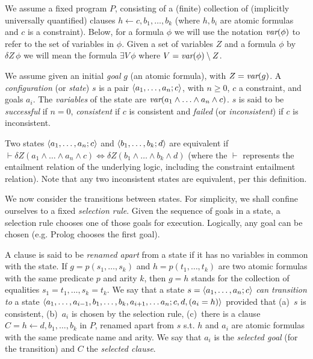 \documentclass{article} %
\begin{document}
We assume a fixed program $P$, consisting of a (finite) collection of (implicitly universally quantified) clauses $h \leftarrow c, b_1, \ldots, b_k$ (where $h, b_i$ are atomic formulas and $c$ is a constraint).  Below, for a formula $\phi$ we will use the notation $\mbox{\em var}(\phi)$ to refer to the set of variables in $\phi$. Given a set of variables $Z$ and a formula $\phi$ by $\delta Z\, \phi$ we will mean the formula $\exists V\,\phi$ where $V=\mbox{\em var}(\phi)\setminus Z$. 

We assume given an initial {\em goal} $g$ (an atomic formula), with $Z=\mbox{\em var}(g)$. A {\em configuration} (or {\em state}) $s$ is a pair $\langle a_1, \ldots, a_n; c\rangle$, with $n\geq 0$, $c$ a constraint, and goals $a_i$. The {\em variables} of the state are $\mbox{\em var}(a_1\wedge\ldots\wedge a_n\wedge c)$. $s$ is said to be {\em successful} if $n=0$, {\em consistent} if $c$ is consistent and {\em failed} (or {\em inconsistent}) if $c$ is inconsistent. 

Two states $\langle a_1, \ldots, a_n; c\rangle$ and $\langle b_1, \ldots, b_k; d\rangle$ are equivalent if $\vdash \delta Z (a_1 \wedge \ldots \wedge a_n \wedge c) \Leftrightarrow \delta Z (b_1 \wedge \ldots \wedge b_k \wedge d)$ (where the $\vdash$ represents the entailment relation of the underlying logic, including the constraint entailment relation). Note that any two inconsistent states are equivalent, per this definition. 

We now consider the transitions between states. For simplicity, we shall confine ourselves to a fixed {\em selection rule}. Given the sequence of goals in a state, a selection rule chooses one of those goals for execution. Logically, any goal can be chosen (e.g.{} Prolog chooses the first goal).

A clause is said to be {\em renamed apart} from a state if it has no variables in common with the state.  If $g=p(s_1,\ldots,s_k)$ and $h=p(t_1,\ldots, t_k)$ are two atomic formulas with the same predicate $p$ and arity $k$, then $g=h$ stands for the collection of equalities $s_1=t_1, \ldots, s_k=t_k$. 
We say that a state 
$s=\langle a_1, \ldots, a_n; c\rangle$ {\em can transition to} 
a state $\langle a_1, \ldots, a_{i-1}, b_1, \ldots, b_k, a_{i+1}, \ldots a_n; c, d, (a_i=h)\rangle$  provided that (a)~$s$ is consistent, (b)~$a_i$ is chosen by the selection rule, (c)~there is a clause $C=h \leftarrow d, b_1,\ldots, b_k$ in $P$, renamed apart from $s$ s.t.{} $h$ and $a_i$ are atomic formulas with the same predicate name and arity. We say that $a_i$ is the {\em selected goal} (for the transition) and $C$ the {\em selected clause}. 
\end{document}
